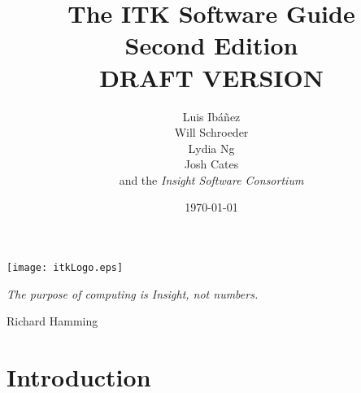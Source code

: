 \documentclass{InsightSoftwareGuide}
\title{The ITK Software Guide\\Second Edition\\DRAFT VERSION}
\author{Luis Ib\'{a}\~{n}ez\\Will Schroeder\\Lydia Ng\\Josh Cates\\
and the \emph{Insight Software Consortium}}
\date{\today}
\newif\ifitkFullVersion
\newif\ifitkPrintedVersion
\begin{document}
\ifitkPrintedVersion

\fi

\maketitle

\frontmatter




%
%
\cleardoublepage

\begin{minipage}[t][10cm][b]{\textwidth}
\center
\texttt{[image: itkLogo.eps]}
\large
\begin{center}
\emph{The purpose of computing is Insight, not numbers.}\\
\end{center}
\hspace{8cm} Richard Hamming
\normalsize
\end{minipage}



%
\pagestyle{plain}
%



\ifitkPrintedVersion 

\fi

\ifitkFullVersion 


\fi



%
%


%
\pagestyle{normal}
%
\small
\tableofcontents
\listoffigures
\listoftables
\normalsize




% 
% 

\mainmatter

\part{Introduction}
\end{document}
